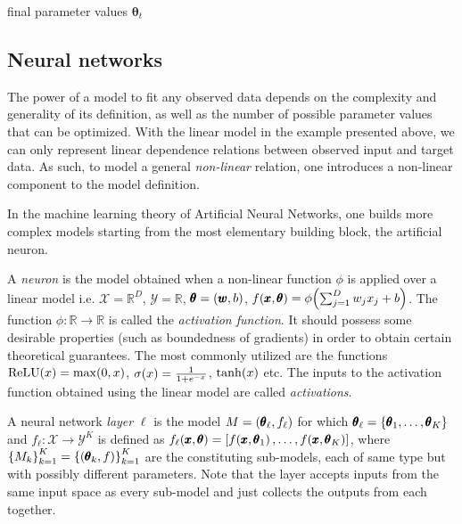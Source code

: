 \begin{algorithm}%
\caption{Stochastic Gradient Descent}
\label{algorithm:sgd}
\begin{algorithmic}
\ENDWHILE
\RETURN final parameter values $\pmb{\theta}_{t}$
\end{algorithmic}
\end{algorithm} 


\subsection{Neural networks}
The power of a model to fit any observed data depends on the complexity and generality of its definition, as well as the number of possible parameter values that can be optimized. With the linear model in the example presented above, we can only represent linear dependence relations between observed input and target data. As such, to model a general \emph{non-linear} relation, one introduces a non-linear component to the model definition.

In the machine learning theory of Artificial Neural Networks, one builds more complex models starting from the most elementary building block, the artificial neuron.
\begin{definition}
A \emph{neuron} is the model obtained when a non-linear function $\phi$ is applied over a linear model i.e. $\mathcal{X} = \mathbb{R}^D$, $\mathcal{Y}=\mathbb{R}$, $\pmb{\theta} = \mathopen{}\left(\pmb{w}, b\right)$, $f\mathopen{}\left(\pmb{x}, \pmb{\theta}\right) = \phi\mathopen{}\left(\sum_{j=1}^{D}{w_j x_j} + b\right)$. The function $\phi: \mathbb{R} \to \mathbb{R}$ is called the \emph{activation function}. It should possess some desirable properties (such as boundedness of gradients) in order to obtain certain theoretical guarantees. The most commonly utilized are the functions $\text{ReLU}\mathopen{}\left(x\right)=\max\mathopen{}\left(0,x\right)$, $\sigma\mathopen{}\left(x\right)=\frac{1}{1+e^{-x}}$, $\tanh\mathopen{}\left(x\right)$ etc. The inputs to the activation function obtained using the linear model are called \emph{activations}.
\end{definition}

\begin{definition}
A neural network \emph{layer} $\ell$ is the model $M = \mathopen{}\left(\pmb{\theta}_{\ell}, f_{\ell}\right)$ for which $\pmb{\theta}_{\ell} = \mathopen{}\left\{\pmb{\theta}_1, \dots, \pmb{\theta}_K\right\}$ and $f_{\ell}: \mathcal{X} \to \mathcal{Y}^K$ is defined as $f_{\ell}\mathopen{}\left(\pmb{x}, \pmb{\theta}\right) = \mathopen{}\left[f\mathopen{}\left(\pmb{x}, \pmb{\theta}_1\right),\dots,f\mathopen{}\left(\pmb{x}, \pmb{\theta}_K\right)\right]$, where $\mathopen{}\left\{M_k\right\}_{k=1}^K=\mathopen{}\left\{\mathopen{}\left(\pmb{\theta}_k, f\right)\right\}_{k=1}^K$ are the constituting sub-models, each of same type but with possibly different parameters. Note that the layer accepts inputs from the same input space as every sub-model and just collects the outputs from each together.
\end{definition}

